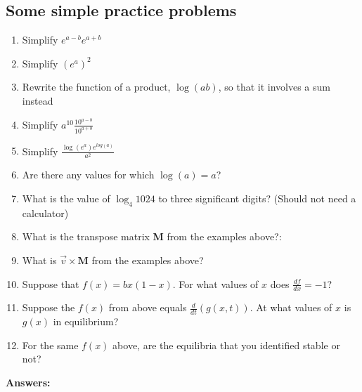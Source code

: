 \documentclass[12pt]{article}
\begin{document}
\subsection{Some simple practice problems}
\begin{enumerate}
\item{} Simplify $e^{a-b}e^{a+b}$
\item{} Simplify $(e^{a})^{2}$
\item{} Rewrite the function of a product, $\log(ab)$, so that it involves a sum instead
\item{} Simplify $a^{10}\frac{10^{a-b}}{10^{a+b}}$
\item{} Simplify $\frac{\log(e^{a})e^{log(a)}}{a^{2}}$
\item{} Are there any values for which $\log(a) = a$?
\item{} What is the value of $\log_{4}1024$ to three significant digits? (Should not need a calculator)
\item{} What is the transpose matrix \textbf{M} from the examples above?:
\item{} What is $\overrightarrow{v}\times\textbf{M}$ from the examples above?
\item{} Suppose that $f(x) = bx(1-x)$. For what values of $x$ does $\frac{df}{dx}=-1$?
\item{} Suppose the $f(x)$ from above equals $\frac{d}{dt}(g(x,t))$. At what values of $x$ is $g(x)$ in equilibrium?
\item{} For the same $f(x)$ above, are the equilibria that you identified stable or not?
\end{enumerate}


\textbf{Answers:}
\end{document}
